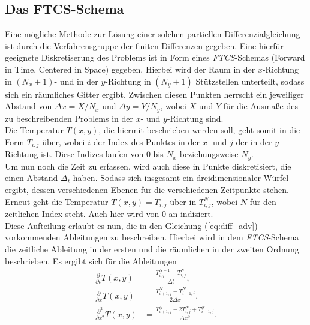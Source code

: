 \documentclass[12pt,a4paper,titlepage,headinclude,bibtotoc]{scrartcl}
\begin{document}
\subsection{Das FTCS-Schema}
Eine mögliche Methode zur Lösung einer solchen partiellen Differenzialgleichung ist durch die Verfahrensgruppe der finiten Differenzen gegeben. Eine hierfür geeignete Diskretiserung des Problems ist in Form eines \textit{FTCS}-Schemas (Forward in Time, Centered in Space) gegeben. Hierbei wird der Raum in der $x$-Richtung in $(N_x+1)$- und in der $y$-Richtung in $(N_y+1)$ Stützstellen unterteilt, sodass sich ein räumliches Gitter ergibt. Zwischen diesen Punkten herrscht ein jeweiliger Abstand von $\Delta x = X/N_x$ und $\Delta y = Y/N_y$, wobei $X$ und $Y$ für die Ausmaße des zu beschreibenden Problems in der $x$- und $y$-Richtung sind.\\
Die Temperatur $T(x, y)$, die hiermit beschrieben werden soll, geht somit in die Form $T_{i,j}$ über, wobei $i$ der Index des Punktes in der $x$- und $j$ der in der $y$-Richtung ist. Diese Indizes laufen von $0$ bis $N_x$ beziehungsweise $N_y$.\\
Um nun noch die Zeit zu erfassen, wird auch diese in Punkte diskretisiert, die einen Abstand $\Delta_t$ haben. Sodass sich insgesamt ein dreidimensionaler Würfel ergibt, dessen verschiedenen Ebenen für die verschiedenen Zeitpunkte stehen. Erneut geht die Temperatur $T(x, y) = T_{i,j}$ über in $T_{i,j}^N$, wobei $N$ für den zeitlichen Index steht. Auch hier wird von $0$ an indiziert.\\

Diese Aufteilung erlaubt es nun, die in den Gleichung (\ref{eq:diff_adv}) vorkommenden Ableitungen zu beschreiben.   
Hierbei wird in dem \textit{FTCS}-Schema die zeitliche Ableitung in der ersten und die räumlichen in der zweiten Ordnung beschrieben.
Es ergibt sich für die Ableitungen
\begin{align}
\frac{\partial}{\partial t}T(x,y) &= \frac{T_{i,j}^{N+1} - T_{i,j}^{N}}{\Delta t}, \\
\frac{\partial}{\partial x}T(x,y) &= \frac{T_{i+1,j}^{N} - T_{i-1,j}^{N}}{2 \Delta x}, \\
\frac{\partial^2}{\partial x^2}T(x,y) &= \frac{T_{i+1,j}^{N} - 2 T_{i,j}^{N} + T_{i-1,j}^{N}}{ \Delta x^2}.
\end{align}
\end{document}

